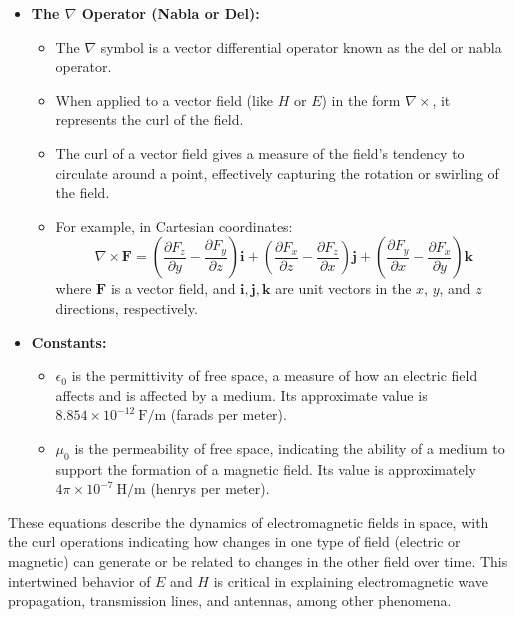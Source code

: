 \begin{airesult}
\begin{itemize}
\item \textbf{The \(\nabla\) Operator (Nabla or Del):}

  \begin{itemize}
  \item The \(\nabla\) symbol is a vector differential operator known as the del or nabla operator.
  \item When applied to a vector field (like \( H \) or \( E \)) in the form \(\nabla \times\), it
represents the curl of the field.
  \item The curl of a vector field gives a measure of the field's tendency to circulate around a
point, effectively capturing the rotation or swirling of the field.

  \item For example, in Cartesian coordinates:
  \[
  \nabla \times \mathbf{F} = \left( \frac{\partial F_z}{\partial y} - \frac{\partial F_y}{\partial
z} \right) \mathbf{i}
  + \left( \frac{\partial F_x}{\partial z} - \frac{\partial F_z}{\partial x} \right) \mathbf{j}
  + \left( \frac{\partial F_y}{\partial x} - \frac{\partial F_x}{\partial y} \right) \mathbf{k}
  \]
  where \(\mathbf{F}\) is a vector field, and \(\mathbf{i}, \mathbf{j}, \mathbf{k}\) are unit
vectors in the \(x\), \(y\), and \(z\) directions, respectively.
  \end{itemize}

\item \textbf{Constants:}

  \begin{itemize}
  \item \(\epsilon_0\) is the permittivity of free space, a measure of how an electric field affects
and is affected by a medium. Its approximate value is \(8.854 \times 10^{-12} \ \text{F/m}\) (farads
per meter).
  \item \(\mu_0\) is the permeability of free space, indicating the ability of a medium to support
the formation of a magnetic field. Its value is approximately \(4\pi \times 10^{-7} \ \text{H/m}\)
(henrys per meter).
  \end{itemize}

\end{itemize}

\vsp

These equations describe the dynamics of electromagnetic fields in space, with the curl operations
indicating how changes in one type of field (electric or magnetic) can generate or be related to
changes in the other field over time. This intertwined behavior of \(E\) and \(H\) is critical in
explaining electromagnetic wave propagation, transmission lines, and antennas, among other
phenomena.
\end{airesult}
